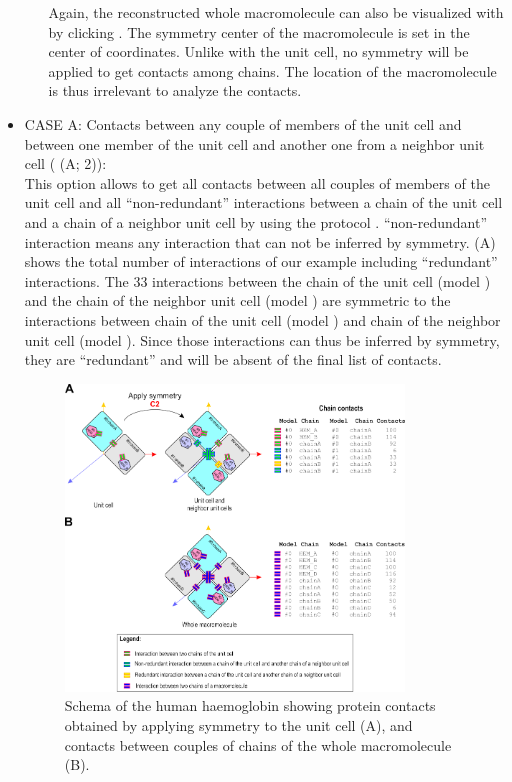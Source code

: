 \begin{itemize}
\begin{itemize}
    Again, the reconstructed whole macromolecule can also be visualized with \chimera by clicking . The symmetry center of the macromolecule is set in the center of coordinates. Unlike with the unit cell, no symmetry will be applied to get contacts among chains. The location of the macromolecule is thus irrelevant to analyze the contacts.
    \end{itemize}
 
 \item CASE A: Contacts between any couple of members of the unit cell and  between one       member of the unit cell and another one from a neighbor unit cell ( (A; 2)):\\
 This option allows to get all contacts between all couples of members of the unit cell and all ``non-redundant'' interactions between a chain of the unit cell and a chain of a neighbor unit cell by using the protocol . ``non-redundant'' interaction means any interaction that can not be inferred by symmetry.  (A) shows the total number of interactions of our example including ``redundant'' interactions. The 33 interactions between the chain  of the unit cell (model ) and the chain  of the neighbor unit cell (model ) are symmetric to the interactions between chain  of the unit cell (model ) and chain  of the neighbor unit cell (model ). Since those interactions can thus be inferred by symmetry, they are ``redundant'' and will be absent of the final list of contacts.  
    
        \begin{figure}[H]
            \centering 
            \captionsetup{width=.7\linewidth} 
            \includegraphics[width=0.85\textwidth]{Images/Fig49}
            \caption{Schema of the human haemoglobin  showing protein contacts obtained by applying symmetry to the unit cell (A), and contacts between couples of chains of the whole macromolecule (B).}
            \label{fig:schema_contacts}
        \end{figure}
        

\end{itemize}
